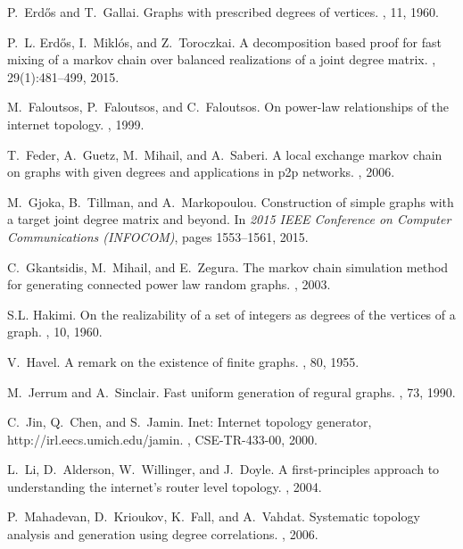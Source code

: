\documentclass[12pt,a4paper]{article}
\theoremstyle{definition}
\theoremstyle{plain}
\begin{document}
\begin{thebibliography}{10}
P.~Erd\H{o}s and T.~Gallai.
\newblock Graphs with prescribed degrees of vertices.
, 11, 1960.

P.~L. Erd\H{o}s, I.~Mikl\'{o}s, and Z.~Toroczkai.
\newblock A decomposition based proof for fast mixing of a markov chain over
  balanced realizations of a joint degree matrix.
, 29(1):481--499, 2015.

M.~Faloutsos, P.~Faloutsos, and C.~Faloutsos.
\newblock On power-law relationships of the internet topology.
, 1999.

T.~Feder, A.~Guetz, M.~Mihail, and A.~Saberi.
\newblock A local exchange markov chain on graphs with given degrees and
  applications in p2p networks.
, 2006.

M.~Gjoka, B.~Tillman, and A.~Markopoulou.
\newblock Construction of simple graphs with a target joint degree matrix and
  beyond.
\newblock In {\em 2015 IEEE Conference on Computer Communications (INFOCOM)},
  pages 1553--1561, 2015.

C.~Gkantsidis, M.~Mihail, and E.~Zegura.
\newblock The markov chain simulation method for generating connected power law
  random graphs.
, 2003.

S.L. Hakimi.
\newblock On the realizability of a set of integers as degrees of the vertices
  of a graph.
, 10, 1960.

V.~Havel.
\newblock A remark on the existence of finite graphs.
, 80, 1955.

M.~Jerrum and A.~Sinclair.
\newblock Fast uniform generation of regural graphs.
, 73, 1990.

C.~Jin, Q.~Chen, and S.~Jamin.
\newblock Inet: Internet topology generator, http://irl.eecs.umich.edu/jamin.
, CSE-TR-433-00, 2000.

L.~Li, D.~Alderson, W.~Willinger, and J.~Doyle.
\newblock A first-principles approach to understanding the internet's router
  level topology.
, 2004.

P.~Mahadevan, D.~Krioukov, K.~Fall, and A.~Vahdat.
\newblock Systematic topology analysis and generation using degree
  correlations.
, 2006.


\end{thebibliography}
\end{document}
